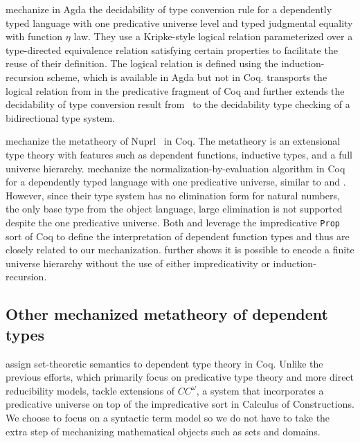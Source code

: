 \documentclass[acmsmall,screen=true,
\ifpublic review=false\else,review=true\fi
  ,anonymous=\ifanonymous true\else false\fi]{acmart}
\newcommand{\scw}[1]{}
\newcommand{\yl}[1]{}
\begin{document}
\citet{decagda} mechanize in Agda the decidability of type
conversion rule for a dependently typed language with one predicative
universe level and typed judgmental equality with function
$\eta$ law. They
use a Kripke-style logical relation parameterized over a
type-directed equivalence relation satisfying certain
properties to facilitate the reuse of their definition. The
logical relation is defined using the induction-recursion scheme,
which is available in Agda but not in Coq.
\citet{martin-lof-a-la-coq} transports the logical relation
from \citet{decagda} in the predicative fragment of Coq and further
extends the decidability of type conversion result
from~\citet{decagda} to the decidability type checking of a
bidirectional type system.

\citet{anand2014towards} mechanize the metatheory of
Nuprl~\citep{constable1986implementing} in Coq. The metatheory is an
extensional type theory with features such as dependent functions,
inductive types, and a full universe hierarchy. \scw{What do they prove?}
\citet{nbeincoq}
mechanize the normalization-by-evaluation algorithm in Coq for a
dependently typed language with one predicative universe, similar to
\citet{decagda} and \citet{martin-lof-a-la-coq}. However, since their
type system has no elimination form for natural numbers, the
only base type from the object language, large elimination is not
supported despite the one predicative universe.
Both \citet{anand2014towards} and \citet{nbeincoq} leverage the
impredicative \texttt{Prop} sort of Coq to define the interpretation
of dependent function types and thus are closely related to our
mechanization. \citet{anand2014towards} further shows it is possible
to encode a finite universe hierarchy without the use of
either impredicativity or induction-recursion.\scw{How did the Nuprl
proof include a full hierarchy? Did they use impredicativity?}

\subsection{Other mechanized metatheory of dependent types}

\citet{barras2010sets, Wang2013SemanticsOI} assign
set-theoretic semantics to dependent type theory in Coq. Unlike the
previous efforts, which primarily focus on predicative
type theory and more direct reducibility models,
\citet{barras2010sets, Wang2013SemanticsOI} tackle extensions of
$CC^\omega$, a system that incorporates a predicative universe on top
of the impredicative sort in Calculus of Constructions. We choose to
focus on a syntactic term model so we do not have to take the extra step
of mechanizing mathematical objects such as sets and domains.
\end{document}
